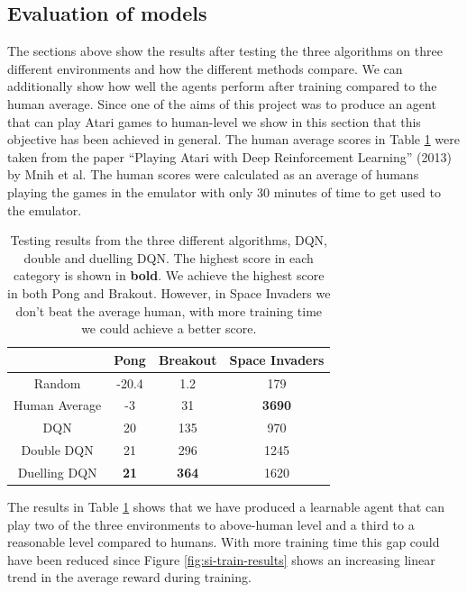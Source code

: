 \subsection{Evaluation of models}

The sections above show the results after testing the three algorithms on three different environments and how the different methods compare. We can additionally show how well the agents perform after training compared to the human average. Since one of the aims of this project was to produce an agent that can play Atari games to human-level we show in this section that this objective has been achieved in general. The human average scores in Table \ref{table:eval:testing-results} were taken from the paper ``Playing Atari with Deep Reinforcement Learning'' (2013) by Mnih et al. The human scores were calculated as an average of humans playing the games in the emulator with only 30 minutes of time to get used to the emulator.

\begin{table}[htbp]
  \centering
  \begin{tabular}{c|c|c|c|}
    \cline{2-4}
    \multicolumn{1}{l|}{}               & Pong        & Breakout     & Space Invaders \\ \hline
    \multicolumn{1}{|c|}{Random}        & -20.4       & 1.2          & 179            \\ \hline
    \multicolumn{1}{|c|}{Human Average} & -3          & 31           & \textbf{3690}  \\ \hline
    \multicolumn{1}{|c|}{DQN}           & 20          & 135          & 970            \\ \hline
    \multicolumn{1}{|c|}{Double DQN}    & 21          & 296          & 1245           \\ \hline
    \multicolumn{1}{|c|}{Duelling DQN}  & \textbf{21} & \textbf{364} & 1620           \\ \hline
  \end{tabular}
  \caption[Testing results for Standard/Double/Duelling DQN]{Testing results from the three different algorithms, DQN, double and duelling DQN. The highest score in each category is shown in \textbf{bold}. We achieve the highest score in both Pong and Brakout. However, in Space Invaders we don't beat the average human, with more training time we could achieve a better score.}\label{table:eval:testing-results}
\end{table}

The results in Table \ref{table:eval:testing-results} shows that we have produced a learnable agent that can play two of the three environments to above-human level and a third to a reasonable level compared to humans. With more training time this gap could have been reduced since Figure \ref{fig:si-train-results} shows an increasing linear trend in the average reward during training.


